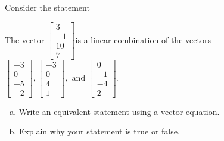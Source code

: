 
\begin{exerciseStatement}


Consider the statement 
\begin{center}\begin{minipage}{0.8\textwidth}
 The vector \( \left[\begin{array}{c}
3 \\
-1 \\
10 \\
7
\end{array}\right] \)is a linear combination of the vectors \( \left[\begin{array}{c}
-3 \\
0 \\
-5 \\
-2
\end{array}\right] , \left[\begin{array}{c}
-3 \\
0 \\
4 \\
1
\end{array}\right] , \text{ and } \left[\begin{array}{c}
0 \\
-1 \\
-4 \\
2
\end{array}\right] \). 
\end{minipage}\end{center}
    


\begin{enumerate}[(a)]
\item  Write an equivalent statement using a vector equation.
\item  Explain why your statement is true or false.
\end{enumerate}
    
\end{exerciseStatement}
    
